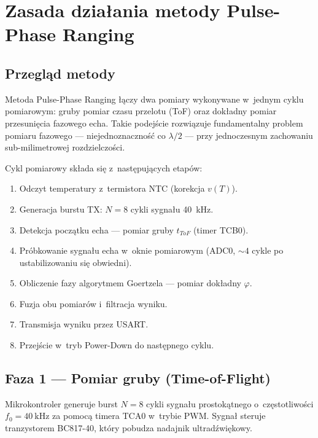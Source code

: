 \documentclass[a4paper,11pt]{article}
\begin{document}
\section{Zasada działania metody Pulse-Phase Ranging}
\label{sec:zasada}

\subsection{Przegląd metody}

Metoda Pulse-Phase Ranging łączy dwa pomiary wykonywane w~jednym cyklu
pomiarowym: gruby pomiar czasu przelotu (ToF) oraz dokładny pomiar przesunięcia
fazowego echa. Takie podejście rozwiązuje fundamentalny problem pomiaru fazowego
--- niejednoznaczność co $\lambda/2$ --- przy jednoczesnym zachowaniu sub-milimetrowej
rozdzielczości.

Cykl pomiarowy składa się z~następujących etapów:
\begin{enumerate}[nosep]
    \item Odczyt temperatury z~termistora NTC (korekcja $v(T)$).
    \item Generacja burstu TX: $N = 8$ cykli sygnału \SI{40}{\kilo\hertz}.
    \item Detekcja początku echa --- pomiar gruby $t_{ToF}$ (timer TCB0).
    \item Próbkowanie sygnału echa w~oknie pomiarowym (ADC0, ${\sim}4$ cykle po ustabilizowaniu się obwiedni).
    \item Obliczenie fazy algorytmem Goertzela --- pomiar dokładny $\varphi$.
    \item Fuzja obu pomiarów i~filtracja wyniku.
    \item Transmisja wyniku przez USART.
    \item Przejście w~tryb Power-Down do następnego cyklu.
\end{enumerate}

\subsection{Faza 1 --- Pomiar gruby (Time-of-Flight)}
\label{sec:tof}

Mikrokontroler generuje burst $N = 8$ cykli sygnału prostokątnego o~częstotliwości
$f_0 = \SI{40}{\kilo\hertz}$ za pomocą timera TCA0 w~trybie PWM. Sygnał
steruje tranzystorem BC817-40, który pobudza nadajnik ultradźwiękowy.
\end{document}
